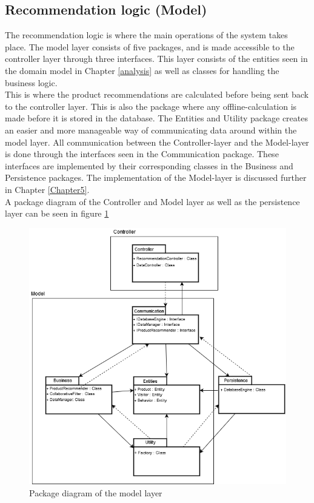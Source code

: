 \subsection{Recommendation logic (Model)}
The recommendation logic is where the main operations of the system takes place. The model layer consists of five packages, and is made accessible to the controller layer through three interfaces. This layer consists of the entities seen in the domain model in Chapter \ref{analysis} as well as classes for handling the business logic. \\This is where the product recommendations are calculated before being sent back to the controller layer. This is also the package where any offline-calculation is made before it is stored in the database. The Entities and Utility package creates an easier and more manageable way of communicating data around within the model layer. All communication between the Controller-layer and the Model-layer is done through the interfaces seen in the Communication package. These interfaces are implemented by their corresponding classes in the Business and Persistence packages. The implementation of the Model-layer is discussed further in Chapter \ref{Chapter5}. \\
A package diagram of the Controller and Model layer as well as the persistence layer can be seen in figure \ref{fig:PackageDiagram}

\begin{figure}[H]
	\centering
	\includegraphics[width=.8\linewidth]{Figures/PackageDiagram.png}
	\caption{Package diagram of the model layer}
	\label{fig:PackageDiagram}
\end{figure}


